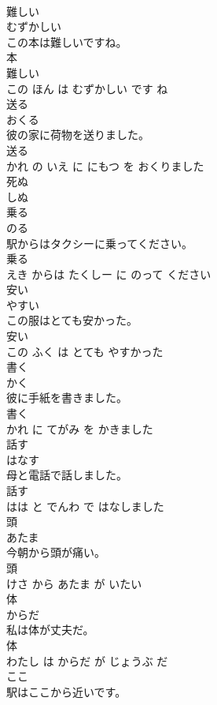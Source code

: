 \documentclass[8pt]{extreport}
\begin{document}
\begin{CJK}{UTF8}{min}
\\	難しい	
\\	むずかしい			
\\	この本は難しいですね。	
\\	本 
\\	難しい 
\\	この ほん は むずかしい です ね			
\\	送る	
\\	おくる			
\\	彼の家に荷物を送りました。	
\\	送る 
\\	かれ の いえ に にもつ を おくりました			
\\	死ぬ	
\\	しぬ			
\\	乗る	
\\	のる			
\\	駅からはタクシーに乗ってください。	
\\	乗る 
\\	えき からは たくしー に のって ください			
\\	安い	
\\	やすい			
\\	この服はとても安かった。	
\\	安い 
\\	この ふく は とても やすかった			
\\	書く	
\\	かく			
\\	彼に手紙を書きました。	
\\	書く 
\\	かれ に てがみ を かきました			
\\	話す	
\\	はなす			
\\	母と電話で話しました。	
\\	話す 
\\	はは と でんわ で はなしました			
\\	頭	
\\	あたま			
\\	今朝から頭が痛い。	
\\	頭 
\\	けさ から あたま が いたい			
\\	体	
\\	からだ			
\\	私は体が丈夫だ。	
\\	体 
\\	わたし は からだ が じょうぶ だ			
\\	ここ	
\\	駅はここから近いです。	

\end{CJK}
\end{document}
